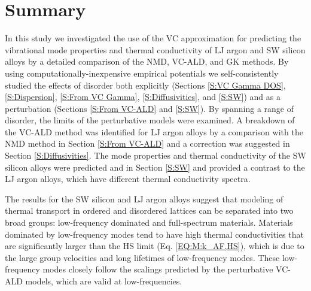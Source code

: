 \documentclass[aps,prb,onecolumn,preprint,footinbib,superscriptaddress,amsmath,amssymb,floatfix]{revtex4}
\begin{document}
\section{\label{S:Summary}Summary}

In this study we investigated the use of the VC 
approximation for predicting the vibrational mode properties and 
thermal conductivity of LJ argon and SW silicon alloys 
by a detailed comparison of the NMD, VC-ALD, and GK methods. 
By using computationally-inexpensive  
empirical potentials we self-consistently studied the effects of 
disorder both explicitly (Sections \ref{S:VC Gamma DOS}, 
\ref{S:Dispersion},  
\ref{S:From VC Gamma}, \ref{S:Diffusivities}, and \ref{S:SW}) 
and as a perturbation (Sections \ref{S:From VC-ALD} and \ref{S:SW}). 
By spanning a range of disorder, the limits of the 
perturbative models were examined.
A breakdown of the VC-ALD method was identified for LJ argon alloys 
by a comparison with the NMD method in 
Section \ref{S:From VC-ALD}   
and a correction was suggested in Section \ref{S:Diffusivities}. 
The mode properties and thermal 
conductivity of the SW silicon alloys were predicted and in 
Section \ref{S:SW} and provided a contrast to the 
LJ argon alloys, which have different thermal conductivity 
spectra. 

The results for the SW silicon and LJ argon alloys suggest that 
modeling of thermal transport in ordered and 
disordered lattices can be separated into two broad groups: 
low-frequency dominated and full-spectrum materials.  
Materials dominated by low-frequency modes tend to have high 
thermal conductivities that are significantly larger than the 
HS limit (Eq. \eqref{EQ:M:k_AF,HS}), 
which is due to the large group velocities and long lifetimes 
of low-frequency modes.\cite{abeles_thermal_1962,
abeles_lattice_1963,kamitakahara_vibrations_1974,
cahill_thermal_2004,cahill_thermal_2005,garg_role_2011,
lindsay_thermal_2012,cheaito_experimental_2012} 
These low-frequency modes  
closely follow the scalings predicted by the perturbative VC-ALD 
models, which are valid at low-frequencies. 
\end{document}
